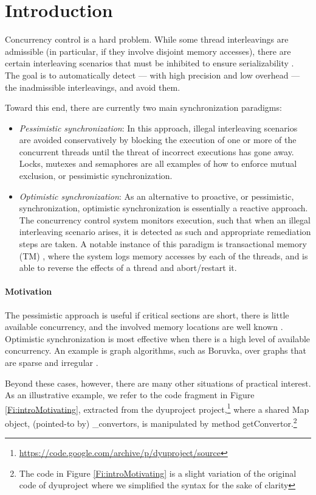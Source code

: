 \section{Introduction}\label{Se:intro}

Concurrency control is a hard problem. While some thread interleavings are admissible (in particular, if they involve disjoint memory accesses), there are certain interleaving scenarios that must be inhibited to ensure serializability \cite{Serializability}. The goal is to automatically detect --- with high precision and low overhead --- the inadmissible interleavings, and avoid them.  

Toward this end, there are currently two main synchronization paradigms:
\begin{itemize}
	\item \textit{Pessimistic synchronization}: In this approach, illegal interleaving scenarios are avoided conservatively by blocking the execution of one or more of the concurrent threads until the threat of incorrect executions has gone away. Locks, mutexes and semaphores are all examples of how to enforce mutual exclusion, or pessimistic synchronization.
	\item \textit{Optimistic synchronization}: As an alternative to proactive, or pessimistic, synchronization, optimistic synchronization is essentially a reactive approach. The concurrency control system monitors execution, such that when an illegal interleaving scenario arises, it is detected as such and appropriate remediation steps are taken. A notable instance of this paradigm is transactional memory (TM) \cite{DBLP:conf/isca/HerlihyM93}, where the system logs memory accesses by each of the threads, and is able to reverse the effects of a thread and abort/restart it.
\end{itemize}

\paragraph{Motivation} The pessimistic approach is useful if critical sections are short, there is little available concurrency, and the involved memory locations are well known \cite{AndiKleen}. Optimistic synchronization is most effective when there is a high level of available concurrency. An example is graph algorithms, such as Boruvka, over graphs that are sparse and irregular \cite{KulkarniGalois}.

Beyond these cases, however, there are many other situations of practical interest. As an illustrative example, we refer to the code fragment in Figure \ref{Fi:introMotivating}, extracted from the {\sf dyuproject} project,\footnote{\url{https://code.google.com/archive/p/dyuproject/source}} where a shared {\sf Map} object, (pointed-to by) {\sf \_convertors}, is manipulated by method {\sf getConvertor}.\footnote{The code in Figure \ref{Fi:introMotivating} is a slight variation of the original code of {\sf dyuproject} where we simplified the syntax for the sake of clarity}

